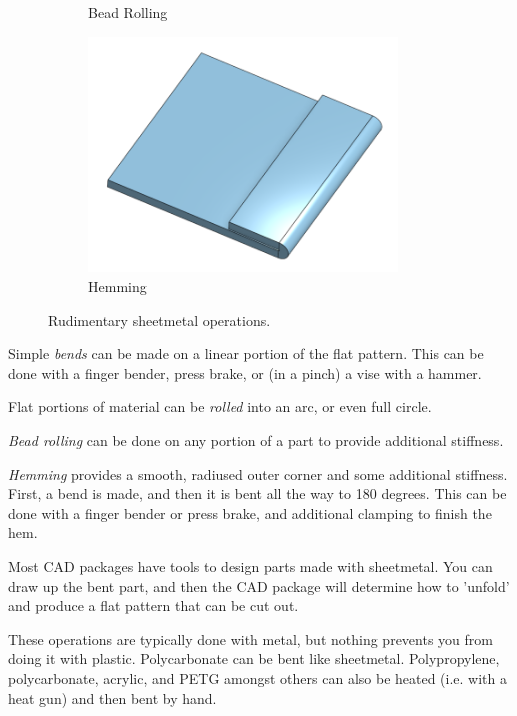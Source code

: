 \documentclass[10pt,letterpaper]{book}
\begin{document}
\begin{figure}[H]
\begin{subfigure}[b]{.24\linewidth}
			\caption{Bead Rolling}
		\end{subfigure}\begin{subfigure}[b]{.24\linewidth}
			\includegraphics[width=0.9\textwidth]{imgs/sheet_hem.png}
			\caption{Hemming}
		\end{subfigure}
		\caption{Rudimentary sheetmetal operations.}
	\end{figure} 
 
 \begin{asparaenum}[a)]
 	\item Simple \textit{bends} can be made on a linear portion of the flat pattern. This can be done with a finger bender, press brake, or (in a pinch) a vise with a hammer.
 	\item Flat portions of material can be \textit{rolled} into an arc, or even full circle.
 	\item \textit{Bead rolling} can be done on any portion of a part to provide additional stiffness.	
 	\item \textit{Hemming} provides a smooth, radiused outer corner and some additional stiffness. First, a bend is made, and then it is bent all the way to 180 degrees. This can be done with a finger bender or press brake, and additional clamping to finish the hem.
 	\end{asparaenum}
 	
 	Most CAD packages have tools to design parts made with sheetmetal. You can draw up the bent part, and then the CAD package will determine how to 'unfold' and produce a flat pattern that can be cut out.
 	
 	These operations are typically done with metal, but nothing prevents you from doing it with plastic. Polycarbonate can be bent like sheetmetal. Polypropylene, polycarbonate, acrylic, and PETG amongst others can also be heated (i.e. with a heat gun) and then bent by hand.
 	
\end{document}
